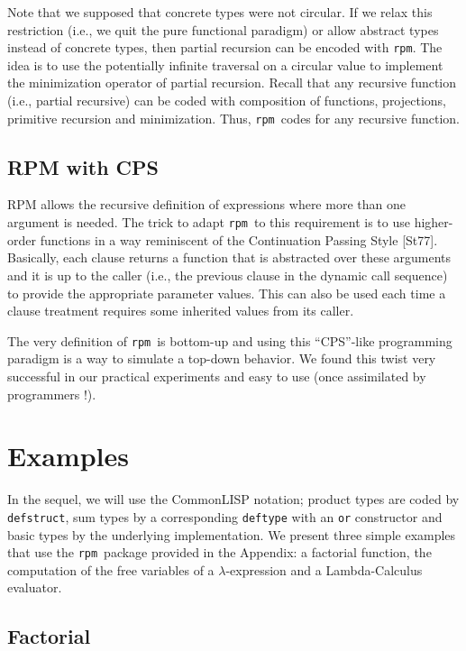 \documentclass[a4paper,11pt]{article}
\newcommand{\rpm}{\texttt{rpm}}
\begin{document}
Note that we supposed that concrete types were not circular. If we
relax this restriction (i.e., we quit the pure functional paradigm) or
allow abstract types instead of concrete types,
then partial recursion can be encoded with \rpm. The idea is to use
the potentially infinite traversal on a circular value to implement
the minimization operator of partial recursion. Recall that any
recursive function (i.e., partial recursive) can be coded with
composition of functions, projections, primitive recursion and
minimization. Thus, \rpm\ codes for any recursive function.

\subsection{RPM with CPS}

RPM allows the recursive definition of expressions where more than one
argument is needed. The trick to adapt \rpm\ to this requirement is to
use higher-order functions in a way reminiscent of the Continuation
Passing Style [St77]. Basically, each clause returns a function that is
abstracted over these arguments and it is up to the caller (i.e., the
previous clause in the dynamic call sequence) to provide the
appropriate parameter values.  This can also be used each time a clause
treatment requires some inherited values from its caller.

The very definition of \rpm\ is bottom-up and using this ``CPS''-like
programming paradigm is a way to simulate a top-down behavior. We
found this twist very successful in our practical experiments and easy
to use (once assimilated by programmers !).

\section{Examples}

In the sequel, we will use the CommonLISP notation; product types are
coded by \texttt{defstruct}, sum types by a corresponding \texttt{deftype}
with an \texttt{or} constructor and basic types by the underlying implementation.
We present three simple examples that use the \rpm\ package provided in
the Appendix: a factorial function, the computation of the free
variables of a $\lambda$-expression and a Lambda-Calculus evaluator.

\subsection{Factorial}
\end{document}
